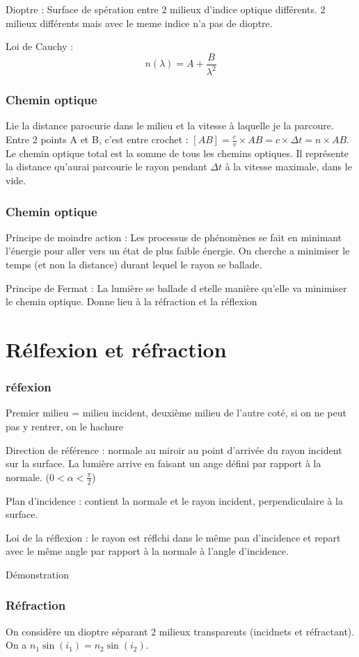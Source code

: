 \documentclass[french]{yLectureNote}
\begin{document}
	Dioptre : Surface de spération entre 2 milieux d'indice optique différents. 2 milieux différents mais avec le meme indice n'a pas de dioptre.

	Loi de Cauchy : \[n(\lambda) = A + \frac{B}{\lambda^2}\]

	\subsection{Chemin optique}
	Lie la distance parocurie dans le milieu et la vitesse à laquelle je la parcoure. Entre 2 points A et B, c'est entre crochet : $[AB] = \frac{c}{v} \times AB = c\times \Delta t = n \times AB$. Le chemin optique total est la somme de tous les chemins optiques. Il représente la distance qu'aurai parcourie le rayon pendant $\Delta t$ à la vitesse maximale, dans le vide.
	\subsection{Chemin optique}
	Principe de moindre action : Les processus de phénomènes se fait en minimant l'énergie pour aller vers un état de plus faible énergie. On cherche a minimiser le temps (et non la distance) durant lequel le rayon se ballade.

	Principe de Fermat : La lumière se ballade d etelle manière qu'elle va minimiser le chemin optique. Donne lieu à la réfraction et la réflexion
	\chapter{Rélfexion et réfraction}
	\subsection{réfexion}
	Premier milieu = milieu incident, deuxième milieu de l'autre coté, si on ne peut pas y rentrer, on le hachure

	Direction de référence : normale au miroir au point d'arrivée du rayon incident sur la surface. La lumière arrive en faisant un ange défini par rapport à la normale. ($0<\alpha<\frac{\pi}{2}$)

	Plan d'incidence : contient la normale et le rayon incident, perpendiculaire à la surface.

	Loi de la réflexion : le rayon est réflchi dans le m\^eme pan d'incidence et repart avec le m\^eme angle par rapport à la normale à l'angle d'incidence.

	Démonstration

	\subsection{Réfraction}
	On considère un dioptre séparant 2 milieux transparents (incidnets et réfractant). On a $n_1\sin(i_1) = n_2 \sin(i_2)$.
\end{document}
